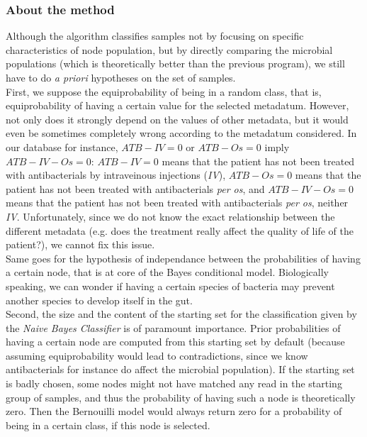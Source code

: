 \documentclass{report}
\begin{document}
\subsubsection{About the method}

Although the algorithm classifies samples not by focusing on specific characteristics of node population, but by directly comparing the microbial populations (which is theoretically better than the previous program), we still have to do \emph{a priori} hypotheses on the set of samples.\\

First, we suppose the equiprobability of being in a random class, that is, equiprobability of having a certain value for the selected metadatum. However, not only does it strongly depend on the values of other metadata, but it would even be sometimes completely wrong according to the metadatum considered. In our database for instance, $ATB-IV = 0$ or $ATB-Os = 0$ imply $ATB-IV-Os = 0$: $ATB-IV = 0$ means that the patient has not been treated with antibacterials by intraveinous injections (\emph{IV}), $ATB-Os = 0$ means that the patient has not been treated with antibacterials \emph{per os}, and $ATB-IV-Os = 0$ means that the patient has not been treated with antibacterials \emph{per os}, neither \emph{IV}. Unfortunately, since we do not know the exact relationship between the different metadata (e.g. does the treatment really affect the quality of life of the patient?), we cannot fix this issue.\\

Same goes for the hypothesis of independance between the probabilities of having a certain node, that is at core of the Bayes conditional model. Biologically speaking, we can wonder if having a certain species of bacteria may prevent another species to develop itself in the gut.\\

Second, the size and the content of the starting set for the classification given by the \emph{Naive Bayes Classifier} is of paramount importance. Prior probabilities of having a certain node are computed from this starting set by default (because assuming equiprobability would lead to contradictions, since we know antibacterials for instance do affect the microbial population). If the starting set is badly chosen, some nodes might not have matched any read in the starting group of samples, and thus the probability of having such a node is theoretically zero. Then the Bernouilli model would always return zero for a probability of being in a certain class, if this node is selected.\\
\end{document}
